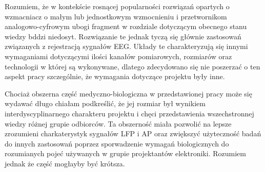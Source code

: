 \begin{frame}[t]
    \begin{block}{\dk}
    \end{block}

    Rozumiem, że w kontekście rosnącej popularności rozwiązań opartych o wzmacniacz o małym lub jednostkowym wzmocnieniu i przetwornikom analogowo-cyfrowym ubogi fragment w rozdziale dotyczącym obecnego stanu wiedzy bddzi niedosyt.
    Rozwiązanie te jednak tyczą  się głównie zastosowań związanych z rejestracją sygnałów EEG. Układy  te charakteryzują się innymi wymaganiami dotyczącymi ilości kanałów pomiarowych, rozmiarów oraz technologii w której są wykonywane, dlatego zdecydowano się nie poszerzać o ten aspekt pracy szczególnie, że wymagania dotyczące projektu były inne. 
\end{frame}


\begin{frame}[t]
    \begin{block}{\dk}
    \end{block}
    Chociaż obszerna część medyczno-biologiczna w przedstawionej pracy może się wydawać długo chiałam podkreślić, że jej rozmiar był wynikiem interdyscyplinarnego charakteru projektu i chęci przedstawienia wszechstronnej wiedzy różnej grupie odbiorców. Ta obszerność miała pozwolić na lepsze zrozumieni charkaterystyk sygnałów LFP i AP oraz zwiększyć użyteczność badań do innych zastosowań poprzez sporwadzenie wymagań biologicznych do rozumianych pojeć używanych w grupie projektantów elektroniki. Rozumiem jednak że część mogłayby być krótsza.
    

\end{frame}


